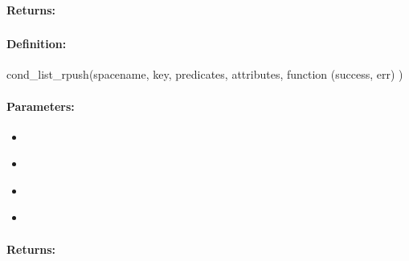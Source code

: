 \paragraph{Returns:}


\pagebreak
\subsubsection{}
\label{api:nodejs:cond_list_rpush}


\paragraph{Definition:}
\begin{javascriptcode}
cond_list_rpush(spacename, key, predicates, attributes, function (success, err) {})
\end{javascriptcode}
\paragraph{Parameters:}
\begin{itemize}[noitemsep]
\item {}\\

\item {}\\

\item {}\\

\item {}\\

\end{itemize}

\paragraph{Returns:}


\pagebreak
\subsubsection{}
\label{api:nodejs:group_list_rpush}


